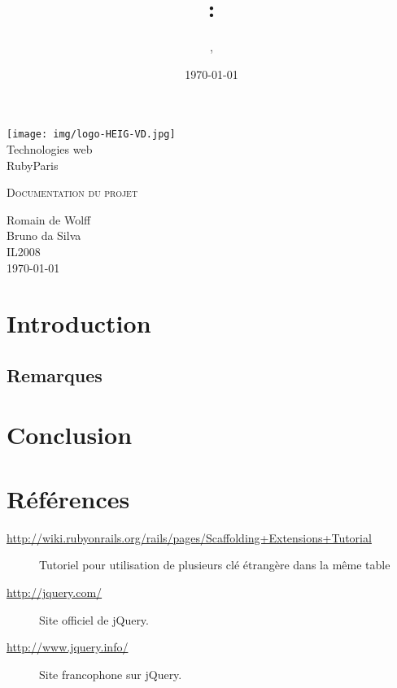 \documentclass[10pt,a4paper,titlepage]{article}
\author{\auteurOne, \auteurTwo}
\title{\branchetag : \laboname}
\date{\today}
\newcommand{\branche}{Technologies web}
\newcommand{\laboname}{RubyParis}
\newcommand{\auteurOne}{Romain de Wolff}
\newcommand{\auteurTwo}{Bruno da Silva}
\newcommand{\promo}{IL2008}
\begin{document}
\pagestyle{headings}
\begin{titlepage}
	\begin{center}
	\texttt{[image: img/logo-HEIG-VD.jpg]}\\
		\vspace{3cm}
		\LARGE \branche %
		\vspace{3cm}\\
		\Huge \laboname \\
		\vspace{3cm}

		\Large \textsc{Documentation du projet} \\
		\vspace{3cm}

		\large \auteurOne \\
		\auteurTwo \\	
		\vspace{10pt}
		\normalsize \textsc{\promo} \\

		\vspace{2cm}
		\today
	\end{center}
\end{titlepage}

\tableofcontents
\newpage
\pagestyle{fancy}

\section{Introduction}

\subsection{Remarques}

\section{Conclusion}

\newpage
\section{Références}
\small
\begin{description}
	\item[\url{http://wiki.rubyonrails.org/rails/pages/Scaffolding+Extensions+Tutorial}] Tutoriel pour utilisation de plusieurs clé étrangère dans la même table
	\item[\url{http://jquery.com/}] {Site officiel de jQuery.}
	\item[\url{http://www.jquery.info/}] {Site francophone sur jQuery.}
\end{description}
\end{document}
